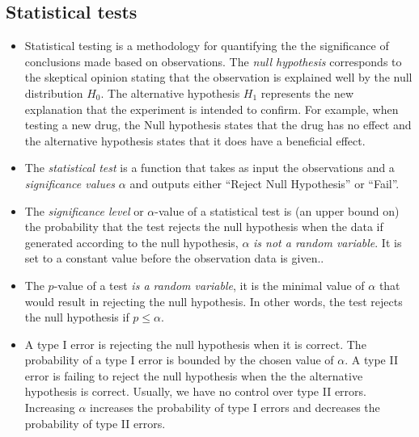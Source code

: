 \documentclass[10pt,twocolumn]{article}
\begin{document}
\subsection*{Statistical tests}
\begin{itemize}
\item Statistical testing is a methodology for quantifying the the
  significance of conclusions made based on observations.
  The {\em null hypothesis} corresponds to the skeptical
  opinion stating that the observation is explained well by the null
  distribution $H_0$. The alternative hypothesis $H_1$ represents the
  new explanation that the experiment is intended to confirm. For
  example, when testing a new drug, the Null hypothesis states that
  the drug has no effect and the alternative hypothesis states that it
  does have a beneficial effect. 
\item The {\em statistical test} is a function that takes as input the
  observations and a {\em significance values} $\alpha$
  and outputs either ``Reject Null Hypothesis'' or ``Fail''.
\item The {\em significance level} or $\alpha$-value of a statistical
  test is (an upper bound on) the probability that the test rejects
  the null hypothesis when the data if generated according to the null
  hypothesis, $\alpha$ {\em is not a random variable}. It is set to a
  constant value before the observation data is given.. 
\item The $p$-value of a test {\em is a random variable}, it is the
  minimal value of $\alpha$ that would result in rejecting the null
  hypothesis. In other words, the test rejects the null hypothesis if
  $p\leq \alpha$.
\item A type I error is rejecting the null hypothesis when it is
  correct. The probability of a type I error is bounded by the chosen
  value of $\alpha$. A type II error is failing to reject the null
  hypothesis when the the alternative hypothesis is correct. Usually,
  we have no control over type II errors. Increasing $\alpha$
  increases the probability of type I errors and decreases the
  probability of type II errors.
\end{itemize}
\end{document}
